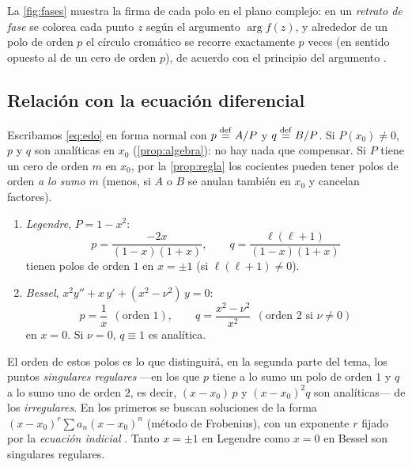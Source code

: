 La \cref{fig:fases} muestra la firma de cada polo en el plano complejo: en
un \emph{retrato de fase} se colorea cada punto $z$ según el argumento
$\arg f(z)$, y alrededor de un polo de orden $p$ el círculo cromático se
recorre exactamente $p$ veces (en sentido opuesto al de un cero de orden $p$),
de acuerdo con el principio del argumento \cite[cap.~4]{AHLFORS}.



\subsection{Relación con la ecuación diferencial}\label{sec:polos-edo}
Escribamos \eqref{eq:edo} en forma normal con
$p\mathrel{\overset{\mathrm{def}}{=}} A/P$ y $q\mathrel{\overset{\mathrm{def}}{=}} B/P$. Si $P(x_0)\neq0$, $p$ y $q$ son analíticas en
$x_0$ (\cref{prop:algebra}): no hay nada que compensar. Si $P$ tiene un cero
de orden $m$ en $x_0$, por la \cref{prop:regla} los cocientes pueden tener
polos de orden \emph{a lo sumo} $m$ (menos, si $A$ o $B$ se anulan también
en $x_0$ y cancelan factores).

\begin{ejemplo}\label{ej:legendre-bessel}
\leavevmode
\begin{enumerate}[label=(\roman*)]
  \item \emph{Legendre}, $P=1-x^{2}$:
        \[
          p=\frac{-2x}{(1-x)(1+x)},\qquad
          q=\frac{\ell(\ell+1)}{(1-x)(1+x)}
        \]
        tienen polos de orden $1$ en $x=\pm1$ (si $\ell(\ell+1)\neq0$).
  \item \emph{Bessel}, $x^{2}y''+x\,y'+(x^{2}-\nu^{2})\,y=0$:
        \[
          p=\frac1x\ \ (\text{orden }1),\qquad
          q=\frac{x^{2}-\nu^{2}}{x^{2}}\ \ (\text{orden }2\text{ si }\nu\neq0)
        \]
        en $x=0$. Si $\nu=0$, $q\equiv1$ es analítica.
\end{enumerate}
\end{ejemplo}

\begin{observacion}\label{obs:avance}
El orden de estos polos es lo que distinguirá, en la segunda parte del tema,
los puntos \emph{singulares regulares} ---en los que $p$ tiene a lo sumo un
polo de orden $1$ y $q$ a lo sumo uno de orden $2$, es decir, $(x-x_0)\,p$ y
$(x-x_0)^{2}q$ son analíticas--- de los \emph{irregulares}. En los primeros
se buscan soluciones de la forma $(x-x_0)^{r}\sum a_n(x-x_0)^n$ (método de
Frobenius), con un exponente $r$ fijado por la \emph{ecuación indicial}
\cite{TEMAV}. Tanto $x=\pm1$ en Legendre como $x=0$ en Bessel son singulares
regulares.
\end{observacion}

